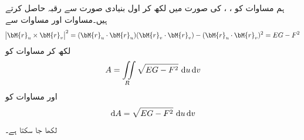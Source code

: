ہم مساوات    کو ، ،  کی صورت میں لکھ کر اول بنیادی صورت سے رقبہ حاصل کرتے ہیں۔مساوات  اور مساوات   سے
\begin{align}\label{مساوات_خطی_تکمل_رقبہ_پ}
\abs{\bM{r}_u\times \bM{r}_v}^2=(\bM{r}_u\cdot \bM{r}_u)(\bM{r}_v\cdot \bM{r}_v)-(\bM{r}_u\cdot \bM{r}_v)^2=EG-F^2
\end{align}
لکھ کر مساوات   کو
\begin{align}\label{مساوات_خطی_تکمل_رقبہ_ت}
A=\iint\limits_R \sqrt{EG-F^2}\,\dif u\dif v
\end{align}
اور مساوات  کو 
\begin{align}\label{مساوات_خطی_تکمل_رقبہ_ٹ}
\dif A=\sqrt{EG-F^2}\,\dif u\dif v
\end{align}
لکھا جا سکتا ہے۔

